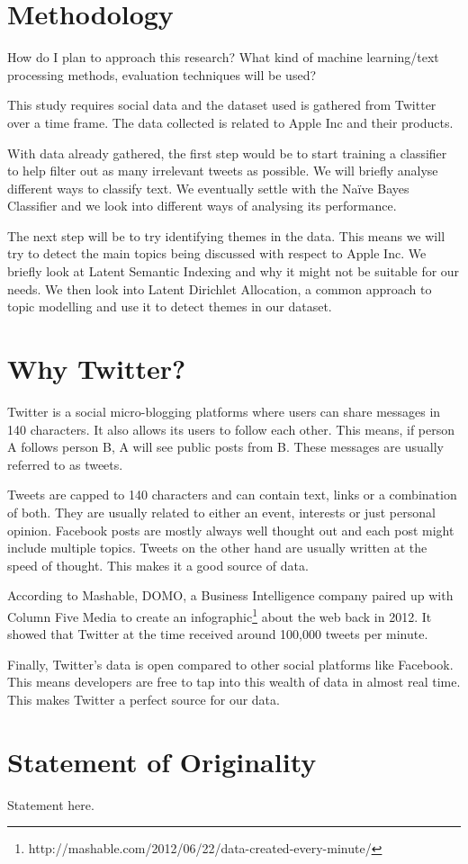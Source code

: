 \section{Methodology}
\label{sec:methodology}
How do I plan to approach this research? What kind of machine learning/text processing methods,
evaluation techniques will be used?

This study requires social data and the dataset used is gathered from Twitter over a time frame.
The data collected is related to Apple Inc and their products.

With data already gathered, the first step would be to start training a classifier to help filter
out as many irrelevant tweets as possible. We will briefly analyse different ways to classify text.
We eventually settle with the Na\"{i}ve Bayes Classifier and we look into different ways of analysing
its performance.

The next step will be to try identifying themes in the data. This means we will try to detect the
main topics being discussed with respect to Apple Inc. We briefly look at Latent Semantic Indexing
and why it might not be suitable for our needs. We then look into Latent Dirichlet Allocation, a
common approach to topic modelling and use it to detect themes in our dataset.


\section{Why Twitter?}
\label{sec:why_twitter}
Twitter is a social micro-blogging platforms where users can share messages in 140 characters. It
also allows its users to follow each other. This means, if person A follows person B, A will see
public posts from B. These messages are usually referred to as tweets.

Tweets are capped to 140 characters and can contain text, links or a combination of both. They are
usually related to either an event, interests or just personal opinion. Facebook posts are mostly
always well thought out and each post might include multiple topics. Tweets on the other hand are
usually written at the speed of thought. This makes it a good source of data.

According to Mashable, DOMO, a Business Intelligence company paired up with Column Five Media to
create an infographic\footnote{http://mashable.com/2012/06/22/data-created-every-minute/} about the
web back in 2012. It showed that Twitter at the time received around 100,000 tweets per minute.

Finally, Twitter's data is open compared to other social platforms like Facebook. This means
developers are free to tap into this wealth of data in almost real time. This makes Twitter a
perfect source for our data.

\section{Statement of Originality}

Statement here.

